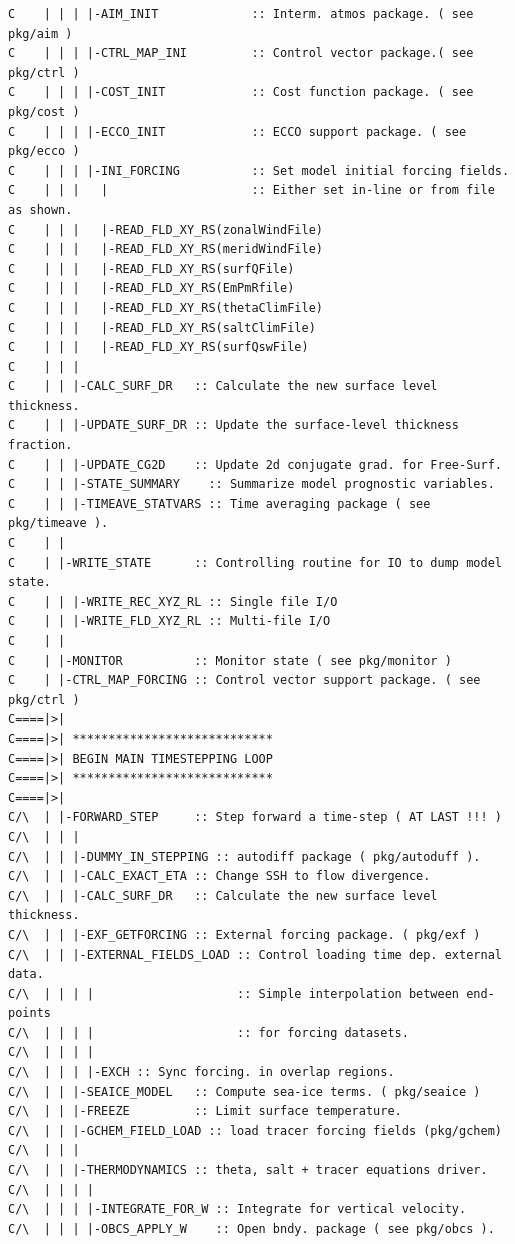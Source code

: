 {\begin{verbatim}
C    | | | |-AIM_INIT             :: Interm. atmos package. ( see pkg/aim )
C    | | | |-CTRL_MAP_INI         :: Control vector package.( see pkg/ctrl )
C    | | | |-COST_INIT            :: Cost function package. ( see pkg/cost )
C    | | | |-ECCO_INIT            :: ECCO support package. ( see pkg/ecco )
C    | | | |-INI_FORCING          :: Set model initial forcing fields.
C    | | |   |                    :: Either set in-line or from file as shown.
C    | | |   |-READ_FLD_XY_RS(zonalWindFile)
C    | | |   |-READ_FLD_XY_RS(meridWindFile)
C    | | |   |-READ_FLD_XY_RS(surfQFile)
C    | | |   |-READ_FLD_XY_RS(EmPmRfile)
C    | | |   |-READ_FLD_XY_RS(thetaClimFile)
C    | | |   |-READ_FLD_XY_RS(saltClimFile)
C    | | |   |-READ_FLD_XY_RS(surfQswFile)
C    | | |
C    | | |-CALC_SURF_DR   :: Calculate the new surface level thickness.
C    | | |-UPDATE_SURF_DR :: Update the surface-level thickness fraction.
C    | | |-UPDATE_CG2D    :: Update 2d conjugate grad. for Free-Surf.
C    | | |-STATE_SUMMARY    :: Summarize model prognostic variables.
C    | | |-TIMEAVE_STATVARS :: Time averaging package ( see pkg/timeave ).
C    | |
C    | |-WRITE_STATE      :: Controlling routine for IO to dump model state.
C    | | |-WRITE_REC_XYZ_RL :: Single file I/O
C    | | |-WRITE_FLD_XYZ_RL :: Multi-file I/O
C    | | 
C    | |-MONITOR          :: Monitor state ( see pkg/monitor )
C    | |-CTRL_MAP_FORCING :: Control vector support package. ( see pkg/ctrl )
C====|>| 
C====|>| ****************************
C====|>| BEGIN MAIN TIMESTEPPING LOOP
C====|>| ****************************
C====|>| 
C/\  | |-FORWARD_STEP     :: Step forward a time-step ( AT LAST !!! )
C/\  | | |
C/\  | | |-DUMMY_IN_STEPPING :: autodiff package ( pkg/autoduff ).
C/\  | | |-CALC_EXACT_ETA :: Change SSH to flow divergence.
C/\  | | |-CALC_SURF_DR   :: Calculate the new surface level thickness.
C/\  | | |-EXF_GETFORCING :: External forcing package. ( pkg/exf )
C/\  | | |-EXTERNAL_FIELDS_LOAD :: Control loading time dep. external data.
C/\  | | | |                    :: Simple interpolation between end-points 
C/\  | | | |                    :: for forcing datasets.
C/\  | | | |                  
C/\  | | | |-EXCH :: Sync forcing. in overlap regions.
C/\  | | |-SEAICE_MODEL   :: Compute sea-ice terms. ( pkg/seaice )
C/\  | | |-FREEZE         :: Limit surface temperature.
C/\  | | |-GCHEM_FIELD_LOAD :: load tracer forcing fields (pkg/gchem)
C/\  | | |
C/\  | | |-THERMODYNAMICS :: theta, salt + tracer equations driver.
C/\  | | | |
C/\  | | | |-INTEGRATE_FOR_W :: Integrate for vertical velocity.
C/\  | | | |-OBCS_APPLY_W    :: Open bndy. package ( see pkg/obcs ).

\end{verbatim}}
